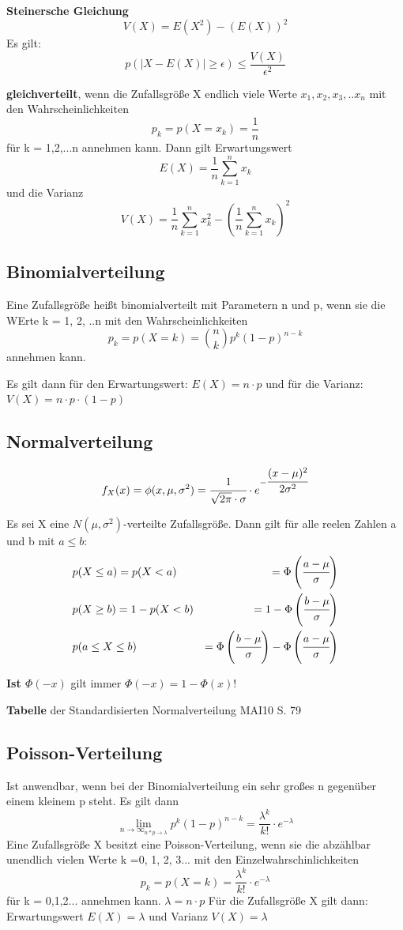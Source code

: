 \documentclass[german]{latex4ei/latex4ei_sheet}
\begin{document}
\begin{sectionbox}


\textbf{Steinersche Gleichung}
 $$V(X) = E(X^2) - (E(X))^2$$
 Es gilt:
 $$p(|X-E(X)|\geq \epsilon) \leq \frac{V(X)}{\epsilon^2}$$

 \textbf{gleichverteilt}, wenn die Zufallsgröße X endlich viele Werte $x_1, x_2, x_3, ..x_n$ mit den Wahrscheinlichkeiten $$p_k = p(X = x_k) = \frac{1}{n} $$ für k = 1,2,...n annehmen kann.
 Dann gilt Erwartungswert $$E(X) = \frac{1}{n}\sum_{k=1}^{n} x_k $$ und die Varianz $$V(X) = \frac{1}{n}\sum_{k=1}^{n}x_k^2-(\frac{1}{n}\sum_{k=1}^n x_k)^2 $$


\subsection{Binomialverteilung}
Eine Zufallsgröße heißt binomialverteilt mit Parametern n und p, wenn sie die WErte k = 1, 2, ..n mit den Wahrscheinlichkeiten $$p_k = p(X = k) = {n \choose k} p^k (1-p)^{n-k}$$ annehmen kann.

 Es gilt dann für den Erwartungswert: $E(X) = n \cdot p $ und für die Varianz: $V(X) = n \cdot p \cdot (1-p) $


\subsection{Normalverteilung}
\begin{align*}
    f_X(x) = \phi(x, \mu, \sigma^2) = \cfrac{1}{\sqrt{2\pi}\cdot \sigma} \cdot e^{-\cfrac{(x-\mu)^2}{2\sigma^2}}
\end{align*}

Es sei X eine $N(\mu, \sigma^2)$-verteilte Zufallsgröße. Dann gilt für alle reelen Zahlen a und b mit $a \leq b$:
\begin{align*}
    &p(X \leq a) = p(X < a) &= \Phi\left(\cfrac{a-\mu}{\sigma}\right) \\
    &p(X \geq b) = 1- p(X < b) &= 1- \Phi\left(\cfrac{b-\mu}{\sigma}\right)\\
    &p(a \leq X \leq b)  &= \Phi\left(\cfrac{b-\mu}{\sigma}\right) - \Phi\left(\cfrac{a-\mu}{\sigma}\right) \\
\end{align*}

\textbf{Ist $\Phi(-x)$} gilt immer $\Phi(-x) = 1- \Phi(x)$!

\textbf{Tabelle} der Standardisierten Normalverteilung MAI10 S. 79


 \subsection{Poisson-Verteilung}
 Ist anwendbar, wenn bei der Binomialverteilung ein sehr großes n gegenüber einem kleinem p steht.
 Es gilt dann $$ \lim_{n \to \infty_{n*p \to \lambda}}p^k (1-p)^{n-k} = \frac{\lambda^k}{k!} \cdot e^{-\lambda}$$
 Eine Zufallsgröße X besitzt eine Poisson-Verteilung, wenn sie die abzählbar unendlich vielen Werte k =0, 1, 2, 3... mit den Einzelwahrschinlichkeiten
 $$ p_k = p(X = k)= \frac{\lambda^k}{k!}\cdot e^{-\lambda} $$ für k = 0,1,2... annehmen kann.
$\lambda = n\cdot p$
Für die Zufallsgröße X gilt dann: Erwartungswert $E(X) = \lambda$ und Varianz $V(X) = \lambda$


\end{sectionbox}
\end{document}
